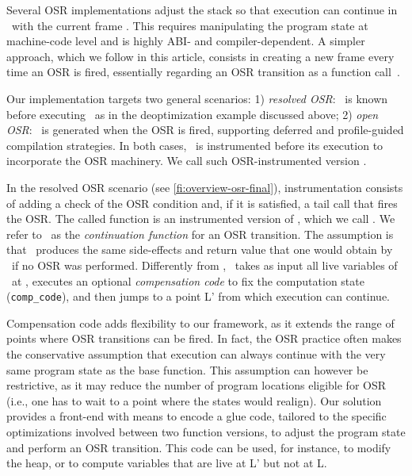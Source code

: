 Several OSR implementations adjust the stack so that execution can continue in \fvariant\ with the current frame \cite{chambers1991self,holzle1992self, suganuma2006region}. This requires manipulating the program state at machine-code level and is highly ABI- and compiler-dependent. A simpler approach, which we follow in this article, consists in creating a new frame every time an OSR is fired, essentially regarding an OSR transition as a function call~\cite{lameed2013modular,webkit14}. 

Our implementation targets two general scenarios: 1) {\em resolved OSR}: \fvariant\ is known before executing \fbase\ as in the deoptimization example discussed above; 2) {\em open OSR}: \fvariant\ is generated when the OSR is fired, supporting deferred and profile-guided compilation strategies. In both cases, \fbase\ is instrumented before its execution to incorporate the OSR machinery. We call such OSR-instrumented version \fosrfrom.

In the resolved OSR scenario (see \myfigure\ref{fi:overview-osr-final}), instrumentation consists of adding a check of the OSR condition and, if it is satisfied, a tail call that fires the OSR. The called function is an instrumented version of \fvariant, which we call \fosrto. We refer to \fosrto\ as the {\em continuation function} for an OSR transition. The assumption is that \fosrto\ produces the same side-effects and return value that one would obtain by \fbase\ if no OSR was performed. Differently from \fvariant, \fosrto\ takes as input all live variables of \fbase\ at \osrpoint, executes an optional {\em compensation code} to fix the computation state ({\tt comp\_code}), and then jumps to a point \textsf{L'} from which execution can continue.

Compensation code adds flexibility to our framework, as it extends the range of points where OSR transitions can be fired. In fact, the OSR practice often makes the conservative assumption that execution can always continue with the very same program state as the base function. %
This assumption can however be restrictive, as it may reduce the number of program locations eligible for OSR (i.e., one has to wait to a point where the states would realign). Our solution provides a front-end with means to encode a glue code, tailored to the specific optimizations involved between two function versions, to adjust the program state and perform an OSR transition. This code can be used, for instance, to modify the heap, or to compute variables that are live at \textsf{L'} but not at \textsf{L}.

